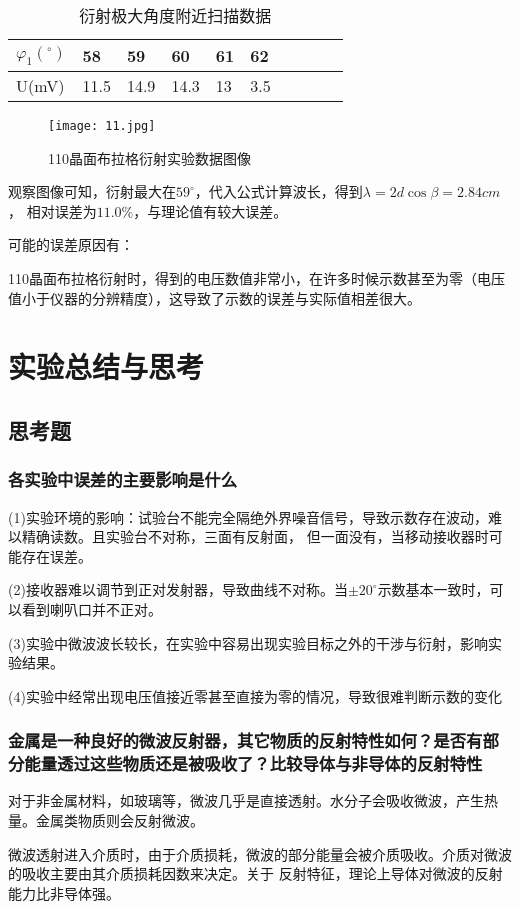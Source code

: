 \documentclass[12pt,a4paper]{article}
\begin{document}
    \begin{table}[H]
        \centering
        \caption{衍射极大角度附近扫描数据}
        \begin{tabular}{|l|l|l|l|l|l|l|l|l|l|}
        \hline
            $\varphi_1(^\circ)$ & 58& 59 & 60& 61 & 62 \\ \hline
            U(mV) & 11.5 &14.9 & 14.3 & 13 & 3.5 \\ \hline
        \end{tabular}
    \end{table}

    \begin{figure}[H]
        \centering
        \caption{110晶面布拉格衍射实验数据图像}
        \texttt{[image: 11.jpg]}
    \end{figure}

    观察图像可知，衍射最大在$59^{\circ}$，代入公式计算波长，得到$\lambda  = 2d\cos \beta  = 2.84cm$，
    相对误差为$11.0\%$，与理论值有较大误差。\par
    可能的误差原因有：\par
    110晶面布拉格衍射时，得到的电压数值非常小，在许多时候示数甚至为零（电压值小于仪器的分辨精度），这导致了示数的误差与实际值相差很大。

    \section{实验总结与思考}
    
    \subsection{思考题}
    \subsubsection{各实验中误差的主要影响是什么}
    (1)实验环境的影响：试验台不能完全隔绝外界噪音信号，导致示数存在波动，难以精确读数。且实验台不对称，三面有反射面，
    但一面没有，当移动接收器时可能存在误差。\par
    (2)接收器难以调节到正对发射器，导致曲线不对称。当$\pm 20^{\circ}$示数基本一致时，可以看到喇叭口并不正对。\par
    (3)实验中微波波长较长，在实验中容易出现实验目标之外的干涉与衍射，影响实验结果。\par
    (4)实验中经常出现电压值接近零甚至直接为零的情况，导致很难判断示数的变化
    \subsubsection{金属是一种良好的微波反射器，其它物质的反射特性如何？是否有部分能量透过这些物质还是被吸收了？比较导体与非导体的反射特性}
    对于非金属材料，如玻璃等，微波几乎是直接透射。水分子会吸收微波，产生热量。金属类物质则会反射微波。\par
    微波透射进入介质时，由于介质损耗，微波的部分能量会被介质吸收。介质对微波的吸收主要由其介质损耗因数来决定。关于
    反射特征，理论上导体对微波的反射能力比非导体强。
\end{document}
